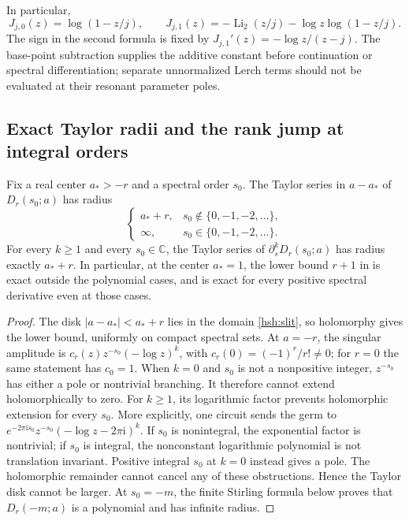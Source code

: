 In particular,
\[
 J_{j,0}(z)=\log(1-z/j),\qquad
 J_{j,1}(z)=-\operatorname{Li}_2(z/j)
                        -\log z\log(1-z/j).
\]
The sign in the second formula is fixed by
$J_{j,1}'(z)=-\log z/(z-j)$.  The base-point subtraction supplies
the additive constant before continuation or spectral differentiation;
separate unnormalized Lerch terms should not be evaluated at their
resonant parameter poles.

\subsection{Exact Taylor radii and the rank jump at integral orders}

\begin{theorem}\label{hsh:radius}
Fix a real center $a_*>-r$ and a spectral order $s_0$.
The Taylor series in $a-a_*$ of $D_r(s_0;a)$ has radius
\[
 \begin{cases}
 a_*+r,&s_0\notin\{0,-1,-2,\ldots\},\\
 \infty,&s_0\in\{0,-1,-2,\ldots\}.
 \end{cases}
\]
For every $k\geq1$ and every $s_0\in\mathbb C$, the Taylor
series of $\partial_s^kD_r(s_0;a)$ has radius exactly $a_*+r$.
In particular, at the center $a_*=1$, the lower bound $r+1$
in \cite{RepoMixed} is exact outside the polynomial cases, and is
exact for every positive spectral derivative even at those cases.
\end{theorem}

\begin{proof}
The disk $|a-a_*|<a_*+r$ lies in the domain
\eqref{hsh:slit}, so holomorphy gives the lower bound, uniformly
on compact spectral sets.  At $a=-r$, the singular amplitude is
$c_r(z)z^{-s_0}(-\log z)^k$, with $c_r(0)=(-1)^r/r!\ne0$;
for $r=0$ the same statement has $c_0=1$.
When $k=0$ and $s_0$ is not a nonpositive integer, $z^{-s_0}$
has either a pole or nontrivial branching.  It therefore cannot
extend holomorphically to zero.  For $k\geq1$, its logarithmic
factor prevents holomorphic extension for every $s_0$.  More
explicitly, one circuit sends the germ to
$e^{-2\pi\mathrm i s_0}z^{-s_0}(-\log z-2\pi\mathrm i)^k$.
If $s_0$ is nonintegral, the exponential factor is nontrivial;
if $s_0$ is integral, the nonconstant logarithmic polynomial is
not translation invariant.  Positive integral $s_0$ at $k=0$
instead gives a pole.  The holomorphic remainder cannot cancel
any of these obstructions.  Hence the Taylor disk cannot be
larger.  At $s_0=-m$, the finite Stirling formula below proves
that $D_r(-m;a)$ is a polynomial and has infinite radius.
\end{proof}

